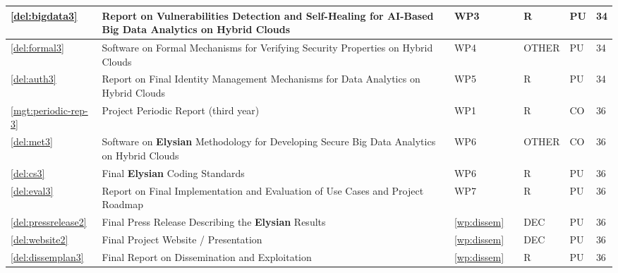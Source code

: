 \documentclass[a4paper,11pt]{article}
\newcommand{\project}[1]{\textbf{#1}\xspace}
\newcommand{\SECURITY}{\project{Elysian}}
\newcommand{\TheProject}{\SECURITY}
\begin{document}
\begin{minipage}{\textwidth}
\begin{center}
\begin{tabular}{|p{0.8cm}|p{9.65cm}|p{0.8cm}|p{1.15cm}|p{1.2cm}|p{0.8cm}|p{0.8cm}|}
\hline \ref{del:bigdata3} & Report on Vulnerabilities Detection and Self-Healing for AI-Based Big Data Analytics on Hybrid Clouds & WP3 & \SCCHshort{} & R & PU & 34 \\
\hline \ref{del:formal3} & Software on Formal Mechanisms for Verifying Security Properties on Hybrid Clouds & WP4 & \SAshort{} & OTHER & PU & 34 \\
\hline \ref{del:auth3} & Report on Final Identity Management Mechanisms for Data Analytics on Hybrid Clouds & WP5 & \COGNIshort{} & R & PU & 34 \\
\hline \ref{mgt:periodic-rep-3} & Project Periodic Report (third year) & WP1 & \coordshort{} & R & CO & 36 \\
\hline \ref{del:met3} & Software on \TheProject{} Methodology for Developing Secure Big Data Analytics on Hybrid Clouds & WP6 & \YAGshort{} & OTHER & CO & 36 \\
\hline \ref{del:cs3} & Final \TheProject{} Coding Standards & WP6 & \UCMshort{} & R & PU & 36 \\
\hline \ref{del:eval3} & Report on Final Implementation and Evaluation of Use Cases and Project Roadmap & WP7 & \FRQshort{} & R & PU & 36 \\
\hline \ref{del:pressrelease2} & Final Press Release Describing the \TheProject{} Results & \ref{wp:dissem} & \SAshort{} & DEC & PU & 36 \\
\hline \ref{del:website2} & Final Project Website / Presentation & \ref{wp:dissem} & \UODshort{} & DEC & PU & 36 \\
\hline \ref{del:dissemplan3} & Final Report on Dissemination and Exploitation & \ref{wp:dissem} & \UODshort{} & R & PU &  36 \\

\hline
\end{tabular}
\end{center}
\end{minipage}




%



\bigskip\bigskip\bigskip
\pagebreak
{}
\end{document}
